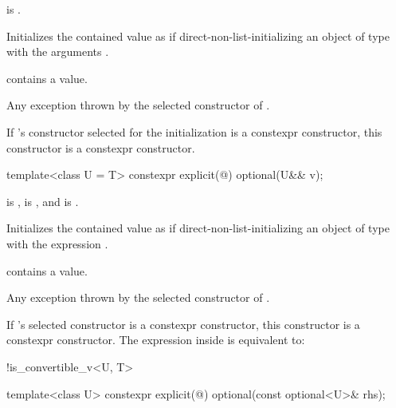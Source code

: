 \begin{itemdescr}
\pnum
\constraints
{} is .

\pnum
\effects
Initializes the contained value as if direct-non-list-initializing an object of type  with the arguments .

\pnum
\ensures
{} contains a value.

\pnum
\throws
Any exception thrown by the selected constructor of .

\pnum
\remarks
If 's constructor selected for the initialization is a constexpr constructor, this constructor is a constexpr constructor.
\end{itemdescr}

%
\begin{itemdecl}
template<class U = T> constexpr explicit(@\seebelow@) optional(U&& v);
\end{itemdecl}

\begin{itemdescr}
\pnum
\constraints
{} is ,
 is , and
 is .

\pnum
\effects
Initializes the contained value as if direct-non-list-initializing
an object of type  with the expression .

\pnum
\ensures
{} contains a value.

\pnum
\throws
Any exception thrown by the selected constructor of .

\pnum
\remarks
If 's selected constructor is a constexpr constructor,
this constructor is a constexpr constructor.
The expression inside  is equivalent to:
\begin{codeblock}
!is_convertible_v<U, T>
\end{codeblock}
\end{itemdescr}

%
\begin{itemdecl}
template<class U> constexpr explicit(@\seebelow@) optional(const optional<U>& rhs);
\end{itemdecl}

